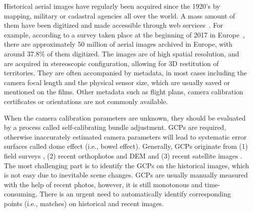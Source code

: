 \par
Historical aerial images have regularly been acquired since the 1920’s by mapping, military or cadastral agencies all over the world. A mass amount of them have been digitized and made accessible through web services~\cite{sebastien2019archiving,earthexplorer,remonterletemps}. 
For example, according to a survey taken place at the beginning of 2017 in Europe~\cite{sebastien2019archiving}, there are approximately 50 million of aerial images archived in Europe, with around 37.8\% of them digitized.
The images are of high spatial resolution, and are acquired in stereoscopic configuration, allowing for 3D restitution of territories. 
They are often accompanied by metadata, in most cases including the camera focal length and the physical sensor size, which are usually saved or mentioned on the films. Other metadata such as flight plans, camera calibration certificates or orientations are not commonly available. 
\par
When the camera calibration parameters are unknown, they should be evaluated by a process called self-calibrating bundle adjustment. \ac{GCP}s are required, otherwise inaccurately estimated camera parameters will lead to systematic error surfaces called dome effect (i.e., bowel effect).
Generally, \ac{GCP}s originate from (1) field surveys \cite{micheletti2015application,walstra2004time,cardenal2006use}, (2) recent orthophotos and DEM \cite{nurminen2015automation,ellis2006measuring,fox2008unlocking} and (3) recent satellite images \cite{ellis2006measuring,ford2013shoreline}. The most challenging part is to identify the \ac{GCP}s on the historical images, which is not easy due to inevitable scene changes. \ac{GCP}s are usually manually measured with the help of recent photos, however, it is still monotonous and time-consuming. 
There is an urgent need to automatically identify corresponding points (i.e., matches) on historical and recent images.\\
